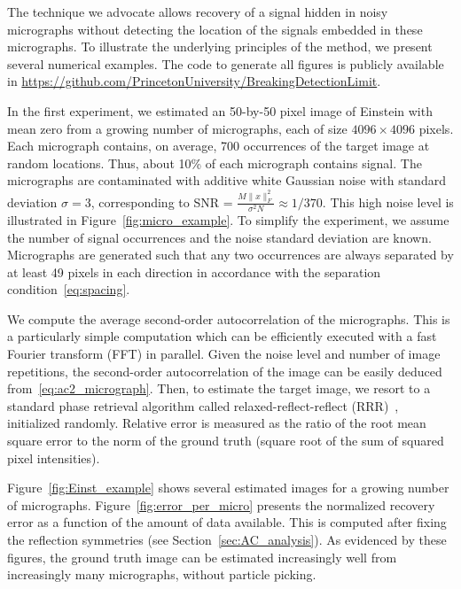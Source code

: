 \documentclass[12pt]{article}
\newcommand{\1}{\mathbf{1}}
\theoremstyle{plain}
\theoremstyle{definition}
\theoremstyle{remark}
\theoremstyle{plain}
\theoremstyle{remark}
\theoremstyle{plain}
\theoremstyle{plain}
\theoremstyle{plain}
\numberwithin{equation}{section}
\begin{document}
The technique we advocate allows recovery of a signal hidden in noisy micrographs without detecting the location  of the signals embedded in these micrographs. To illustrate the underlying principles of the method, we present several numerical examples. The code to generate all figures is publicly available in \url{https://github.com/PrincetonUniversity/BreakingDetectionLimit}.

In the first experiment, we estimated 
an 50-by-50 pixel image of Einstein with mean zero from a growing number of micrographs, each of size $4096\times 4096$ pixels. Each micrograph contains, on average, 700 occurrences of the target image at random locations. 
Thus, about 10\% of each micrograph contains signal. The micrographs are contaminated with additive white Gaussian noise with standard deviation $\sigma=3$,  corresponding  to SNR = $\frac{M\|x\|_F^2} {\sigma^2N} \approx1/370$. This high noise level is illustrated in Figure~\ref{fig:micro_example}. 
To simplify the experiment, we assume the number of signal occurrences and the noise standard deviation are known. Micrographs are generated such that any two occurrences are always separated by at least 49 pixels in each direction in accordance with the separation condition~\eqref{eq:spacing}. 

We compute the average second-order autocorrelation of the micrographs. This is a particularly simple computation which can be efficiently executed with a fast Fourier transform (FFT) in parallel.  
Given the noise level and number of image repetitions, the second-order autocorrelation of the image can be easily deduced from~\eqref{eq:ac2_micrograph}.  Then, to estimate the target image, we resort to a standard phase retrieval algorithm called relaxed-reflect-reflect (RRR)~\cite{elser2017rrr}, initialized randomly.
Relative error is measured as the ratio of the root mean square error to the norm of the ground truth (square root of the sum of squared pixel intensities).

Figure~\ref{fig:Einst_example} shows several estimated images for a growing number of micrographs. 
Figure~\ref{fig:error_per_micro} %
presents the normalized recovery error as a function of the amount of data available.  This is computed after fixing the reflection symmetries (see Section~\ref{sec:AC_analysis}). As evidenced by these figures, the ground truth image can be estimated increasingly well from increasingly many micrographs, without particle picking.
\end{document}
